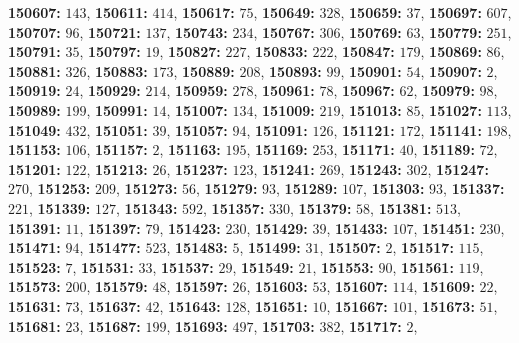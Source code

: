\textsf{\bfseries 150607:} $143$, \textsf{\bfseries 150611:} $414$, \textsf{\bfseries 150617:} $75$, \textsf{\bfseries 150649:} $328$, \textsf{\bfseries 150659:} $37$, \textsf{\bfseries 150697:} $607$, \textsf{\bfseries 150707:} $96$, \textsf{\bfseries 150721:} $137$, \textsf{\bfseries 150743:} $234$, \textsf{\bfseries 150767:} $306$, \textsf{\bfseries 150769:} $63$, \textsf{\bfseries 150779:} $251$, \textsf{\bfseries 150791:} $35$, \textsf{\bfseries 150797:} $19$, \textsf{\bfseries 150827:} $227$, \textsf{\bfseries 150833:} $222$, \textsf{\bfseries 150847:} $179$, \textsf{\bfseries 150869:} $86$, \textsf{\bfseries 150881:} $326$, \textsf{\bfseries 150883:} $173$, \textsf{\bfseries 150889:} $208$, \textsf{\bfseries 150893:} $99$, \textsf{\bfseries 150901:} $54$, \textsf{\bfseries 150907:} $2$, \textsf{\bfseries 150919:} $24$, \textsf{\bfseries 150929:} $214$, \textsf{\bfseries 150959:} $278$, \textsf{\bfseries 150961:} $78$, \textsf{\bfseries 150967:} $62$, \textsf{\bfseries 150979:} $98$, \textsf{\bfseries 150989:} $199$, \textsf{\bfseries 150991:} $14$, \textsf{\bfseries 151007:} $134$, \textsf{\bfseries 151009:} $219$, \textsf{\bfseries 151013:} $85$, \textsf{\bfseries 151027:} $113$, \textsf{\bfseries 151049:} $432$, \textsf{\bfseries 151051:} $39$, \textsf{\bfseries 151057:} $94$, \textsf{\bfseries 151091:} $126$, \textsf{\bfseries 151121:} $172$, \textsf{\bfseries 151141:} $198$, \textsf{\bfseries 151153:} $106$, \textsf{\bfseries 151157:} $2$, \textsf{\bfseries 151163:} $195$, \textsf{\bfseries 151169:} $253$, \textsf{\bfseries 151171:} $40$, \textsf{\bfseries 151189:} $72$, \textsf{\bfseries 151201:} $122$, \textsf{\bfseries 151213:} $26$, \textsf{\bfseries 151237:} $123$, \textsf{\bfseries 151241:} $269$, \textsf{\bfseries 151243:} $302$, \textsf{\bfseries 151247:} $270$, \textsf{\bfseries 151253:} $209$, \textsf{\bfseries 151273:} $56$, \textsf{\bfseries 151279:} $93$, \textsf{\bfseries 151289:} $107$, \textsf{\bfseries 151303:} $93$, \textsf{\bfseries 151337:} $221$, \textsf{\bfseries 151339:} $127$, \textsf{\bfseries 151343:} $592$, \textsf{\bfseries 151357:} $330$, \textsf{\bfseries 151379:} $58$, \textsf{\bfseries 151381:} $513$, \textsf{\bfseries 151391:} $11$, \textsf{\bfseries 151397:} $79$, \textsf{\bfseries 151423:} $230$, \textsf{\bfseries 151429:} $39$, \textsf{\bfseries 151433:} $107$, \textsf{\bfseries 151451:} $230$, \textsf{\bfseries 151471:} $94$, \textsf{\bfseries 151477:} $523$, \textsf{\bfseries 151483:} $5$, \textsf{\bfseries 151499:} $31$, \textsf{\bfseries 151507:} $2$, \textsf{\bfseries 151517:} $115$, \textsf{\bfseries 151523:} $7$, \textsf{\bfseries 151531:} $33$, \textsf{\bfseries 151537:} $29$, \textsf{\bfseries 151549:} $21$, \textsf{\bfseries 151553:} $90$, \textsf{\bfseries 151561:} $119$, \textsf{\bfseries 151573:} $200$, \textsf{\bfseries 151579:} $48$, \textsf{\bfseries 151597:} $26$, \textsf{\bfseries 151603:} $53$, \textsf{\bfseries 151607:} $114$, \textsf{\bfseries 151609:} $22$, \textsf{\bfseries 151631:} $73$, \textsf{\bfseries 151637:} $42$, \textsf{\bfseries 151643:} $128$, \textsf{\bfseries 151651:} $10$, \textsf{\bfseries 151667:} $101$, \textsf{\bfseries 151673:} $51$, \textsf{\bfseries 151681:} $23$, \textsf{\bfseries 151687:} $199$, \textsf{\bfseries 151693:} $497$, \textsf{\bfseries 151703:} $382$, \textsf{\bfseries 151717:} $2$, 
